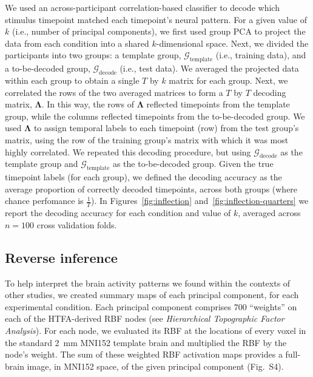 \documentclass[english, 11pt]{article}
\newcommand{\componentBrains}{S4}
\begin{document}
We used an across-participant correlation-based classifier to decode which
stimulus timepoint matched each timepoint's neural pattern. For a given value
of $k$ (i.e., number of principal components), we first used group PCA to
project the data from each condition into a shared $k$-dimensional space. Next,
we divided the participants into two groups: a template group,
$\mathcal{G}_{\mathrm{template}}$ (i.e., training data), and a to-be-decoded
group, $\mathcal{G}_{\mathrm{decode}}$ (i.e., test data). We averaged the
projected data within each group to obtain a single $T$ by $k$ matrix for each
group. Next, we correlated the rows of the two averaged matrices to form a $T$
by $T$ decoding matrix, $\mathbf{\Lambda}$. In this way, the rows of
$\mathbf{\Lambda}$ reflected timepoints from the template group, while the
columns reflected timepoints from the to-be-decoded group. We used
$\mathbf{\Lambda}$ to assign temporal labels to each timepoint (row) from the
test group's matrix, using the row of the training group's matrix with which it
was most highly correlated. We repeated this decoding procedure, but using
$\mathcal{G}_{\mathrm{decode}}$ as the template group and
$\mathcal{G}_{\mathrm{template}}$ as the to-be-decoded group. Given the true
timepoint labels (for each group), we defined the decoding accuracy as the
average proportion of correctly decoded timepoints, across both groups (where
chance perfomance is $\frac{1}{T}$). In Figures~\ref{fig:inflection}
and~\ref{fig:inflection-quarters} we report the decoding accuracy for each
condition and value of $k$, averaged across $n = 100$ cross validation folds.

\subsection*{Reverse inference}

To help interpret the brain activity patterns we found within the contexts of
other studies, we created summary maps of each principal component, for each
experimental condition. Each principal component comprises 700 ``weights'' on
each of the HTFA-derived RBF nodes (see \textit{Hierarchical Topographic Factor
Analysis}). For each node, we evaluated its RBF at the locations of every voxel
in the standard 2~mm MNI152 template brain and multiplied the RBF by the node's
weight. The sum of these weighted RBF activation maps provides a full-brain
image, in MNI152 space, of the given principal component (Fig.~\componentBrains).
\end{document}
